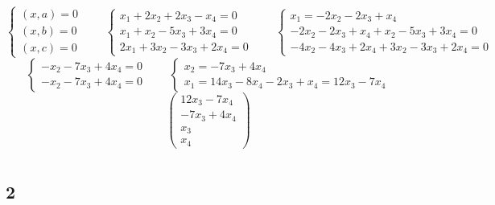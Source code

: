 $$
\begin{cases}
    (x, a) = 0 \\
    (x, b) = 0 \\
    (x, c) = 0
\end{cases} \qquad
\begin{cases}
	x_1 + 2x_2 + 2x_3 - x_4 = 0 \\
    x_1 + x_2 - 5x_3 + 3x_4 = 0 \\
    2x_1 + 3x_2 - 3x_3 + 2x_4 = 0
\end{cases} \qquad
\begin{cases}
	x_1 = -2x_2 - 2x_3 + x_4 \\
    -2x_2 - 2x_3 + x_4 + x_2 - 5x_3 + 3x_4 = 0 \\
    -4x_2 - 4x_3 + 2x_4 + 3x_2 - 3x_3 + 2x_4 = 0
\end{cases} $$
$$
\begin{cases}
	-x_2 - 7x_3 + 4x_4 = 0 \\
    -x_2 - 7x_3 + 4x_4 = 0
\end{cases} \qquad
\begin{cases}
	x_2 = -7x_3 + 4x_4 \\
    x_1 = 14x_3 - 8x_4 - 2x_3 + x_4 = 12x_3 - 7x_4
\end{cases} $$
$$
\begin{pmatrix}
	12x_3 - 7x_4 \\
    -7x_3 + 4x_4 \\
    x_3 \\
    x_4
\end{pmatrix} $$

\section{}

\subsection{2}

